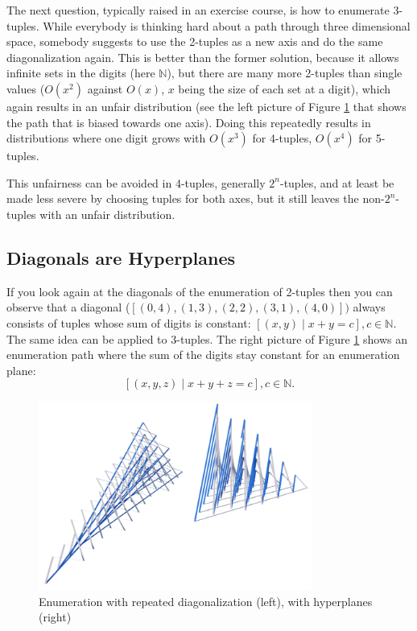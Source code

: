 \documentclass{tmr}
\newcommand{\authornote}[3]{{\color{#2} {\sc #1}: #3}}
\newcommand\bay[1]{\authornote{edward}{blue}{#1}}
\begin{document}
The next question, typically raised in an exercise course, is how to enumerate 3-tuples.
While everybody is thinking hard about a path through three dimensional space, somebody suggests to use the 2-tuples as a new axis and do the same diagonalization again. This is better than the former solution, %
because it allows infinite sets in the digits (here $\mathbb{N}$), but there are many more 2-tuples  than single values ($O(x^2)$ against $O(x)$, $x$ being the size of each set at a digit), which again results in an unfair distribution (see the left picture of Figure \ref{enum3} that shows the path that is biased towards one axis). Doing this repeatedly results in distributions where one digit grows with $O(x^3)$ for 4-tuples, $O(x^4)$ for 5-tuples.

This unfairness can be avoided in 4-tuples, generally $2^n$-tuples, and at least be made less severe by choosing tuples for both axes, %
but it still leaves the non-$2^n$-tuples with an unfair distribution.  %

\subsection{Diagonals are Hyperplanes}
If you look again at the diagonals of the enumeration of 2-tuples then you can observe that a diagonal (\eg $ [ (0,4), (1,3), (2,2), (3,1), (4,0) ])$ always consists of tuples whose sum of digits is constant:
$  [ (x,y)  \mid  x+y  = c ], c \in \mathbb{N}. $
The same idea can be applied to 3-tuples. The right picture of Figure \ref{enum3} shows an enumeration path where the sum of the digits stay constant for an enumeration plane:
\[  [ (x,y,z)  \mid  x+y+z  = c ], c \in \mathbb{N}. \]

\begin{figure}[htbp]
  \centering
    \includegraphics[width=0.8\textwidth]{enumerate2.png}
    \caption{Enumeration with repeated diagonalization (left), with hyperplanes (right) }%
  \label{enum3}
\end{figure}
\end{document}
